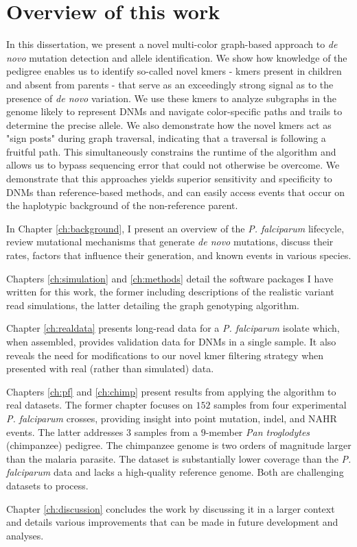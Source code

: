 \section{Overview of this work}

In this dissertation, we present a novel multi-color graph-based approach to \textit{de novo} mutation detection and allele identification.  We show how knowledge of the pedigree enables us to identify so-called novel kmers - kmers present in children and absent from parents - that serve as an exceedingly strong signal as to the presence of \textit{de novo} variation.  We use these kmers to analyze subgraphs in the genome likely to represent DNMs and navigate color-specific paths and trails to determine the precise allele.  We also demonstrate how the novel kmers act as "sign posts" during graph traversal, indicating that a traversal is following a fruitful path.  This simultaneously constrains the runtime of the algorithm and allows us to bypass sequencing error that could not otherwise be overcome.  We demonstrate that this approaches yields superior sensitivity and specificity to DNMs than reference-based methods, and can easily access events that occur on the haplotypic background of the non-reference parent.  

In Chapter \ref{ch:background}, I present an overview of the \textit{P. falciparum} lifecycle, review mutational mechanisms that generate \textit{de novo} mutations, discuss their rates, factors that influence their generation, and known events in various species.

Chapters \ref{ch:simulation} and \ref{ch:methods} detail the software packages I have written for this work, the former including descriptions of the realistic variant read simulations, the latter detailing the graph genotyping algorithm.

Chapter \ref{ch:realdata} presents long-read data for a \textit{P. falciparum} isolate which, when assembled, provides validation data for DNMs in a single sample.  It also reveals the need for modifications to our novel kmer filtering strategy when presented with real (rather than simulated) data.

Chapters \ref{ch:pf} and \ref{ch:chimp} present results from applying the algorithm to real datasets.  The former chapter focuses on $152$ samples from four experimental \textit{P. falciparum} crosses, providing insight into point mutation, indel, and NAHR events.  The latter addresses $3$ samples from a $9$-member \textit{Pan troglodytes} (chimpanzee) pedigree.  The chimpanzee genome is two orders of magnitude larger than the malaria parasite.  The dataset is substantially lower coverage than the \textit{P. falciparum} data and lacks a high-quality reference genome.  Both are challenging datasets to process.

Chapter \ref{ch:discussion} concludes the work by discussing it in a larger context and details various improvements that can be made in future development and analyses.
